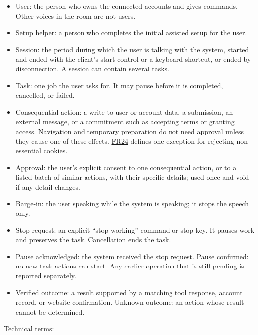 \documentclass{scrreprt}
\theoremstyle{definition}
\newcommand{\reqlink}[1]{\hyperlink{req:#1}{#1}}
\begin{document}
\begin{itemize}
    \item User: the person who owns the connected accounts and gives commands. Other voices in the room are not users.
    \item Setup helper: a person who completes the initial assisted setup for the user.
    \item Session: the period during which the user is talking with the system, started and ended with the client's start control or a keyboard shortcut, or ended by disconnection. A session can contain several tasks.
    \item Task: one job the user asks for. It may pause before it is completed, cancelled, or failed.
    \item Consequential action: a write to user or account data, a submission, an external message, or a commitment such as accepting terms or granting access. Navigation and temporary preparation do not need approval unless they cause one of these effects. \reqlink{FR24} defines one exception for rejecting non-essential cookies.
    \item Approval: the user's explicit consent to one consequential action, or to a listed batch of similar actions, with their specific details; used once and void if any detail changes.
    \item Barge-in: the user speaking while the system is speaking; it stops the speech only.
    \item Stop request: an explicit ``stop working'' command or stop key. It pauses work and preserves the task. Cancellation ends the task.
    \item Pause acknowledged: the system received the stop request. Pause confirmed: no new task actions can start. Any earlier operation that is still pending is reported separately.
    \item Verified outcome: a result supported by a matching tool response, account record, or website confirmation. Unknown outcome: an action whose result cannot be determined.
\end{itemize}

Technical terms:
\end{document}
